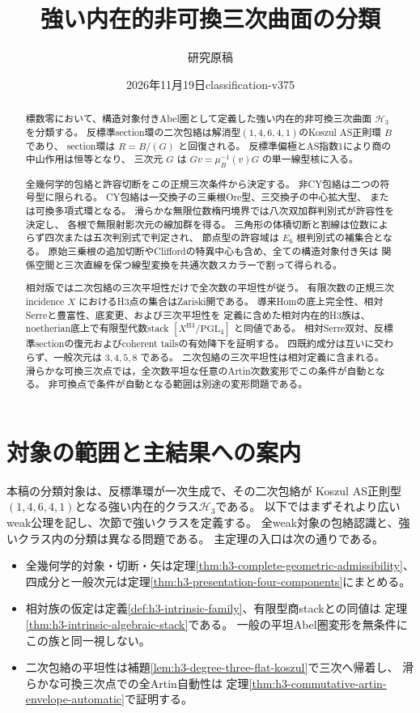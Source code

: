 \documentclass[11pt,a4paper]{ltjsarticle}
\title{強い内在的非可換三次曲面の分類}
\author{研究原稿}
\date{2026年11月19日\quad classification-v375}
\theoremstyle{definition}\newtheorem{definition}[theorem]{定義}
\begin{document}
\maketitle
\begin{abstract}
標数零において、構造対象付きAbel圏として定義した強い内在的非可換三次曲面
$\mathcal H_3$ を分類する。
反標準section環の二次包絡は解消型$(1,4,6,4,1)$のKoszul AS正則環 $B$ であり、
section環は $R=B/(G)$ と回復される。
反標準偏極とAS指数1により商の中山作用は恒等となり、
三次元 $G$ は $Gv=\mu_B^{-1}(v)G$ の単一線型核に入る。

全幾何学的包絡と許容切断をこの正規三次条件から決定する。
非CY包絡は二つの符号型に限られる。
CY包絡は一交換子の三乗根Ore型、三交換子の中心拡大型、
または可換多項式環となる。
滑らかな無限位数楕円境界では八次双加群判別式が許容性を決定し、
各根で無限射影次元の線加群を得る。
三角形の体積切断と割線は位数によらず四次または五次判別式で判定され、
節点型の許容域は $E_6$ 根判別式の補集合となる。
原始三乗根の追加切断やCliffordの特異中心も含め、全ての構造対象付き矢は
関係空間と三次直線を保つ線型変換を共通次数スカラーで割って得られる。

相対版では二次包絡の三次平坦性だけで全次数の平坦性が従う。
有限次数の正規三次incidence $X$ におけるH3点の集合はZariski開である。
導来Homの底上完全性、相対Serreと豊富性、底変更、および三次平坦性を
定義に含めた相対内在的H3族は、noetherian底上で有限型代数stack
$[X^{\mathrm{H3}}/\mathrm{PGL}_4]$ と同値である。
相対Serre双対、反標準sectionの復元およびcoherent tailsの有効降下を証明する。
四既約成分は互いに交わらず、一般次元は $3,4,5,8$ である。
二次包絡の三次平坦性は相対定義に含まれる。
滑らかな可換三次点では，全次数平坦な任意のArtin次数変形でこの条件が自動となる。
非可換点で条件が自動となる範囲は別途の変形問題である。
\end{abstract}
\tableofcontents

\section{対象の範囲と主結果への案内}
本稿の分類対象は、反標準環が一次生成で、その二次包絡が
Koszul AS正則型$(1,4,6,4,1)$となる強い内在的クラス$\mathcal H_3$である。
以下ではまずそれより広いweak公理を記し、次節で強いクラスを定義する。
全weak対象の包絡認識と、強いクラス内の分類は異なる問題である。
主定理の入口は次の通りである。
\begin{itemize}
\item 全幾何学的対象・切断・矢は定理\ref{thm:h3-complete-geometric-admissibility}、
四成分と一般次元は定理\ref{thm:h3-presentation-four-components}にまとめる。
\item 相対族の仮定は定義\ref{def:h3-intrinsic-family}、有限型商stackとの同値は
定理\ref{thm:h3-intrinsic-algebraic-stack}である。
一般の平坦Abel圏変形を無条件にこの族と同一視しない。
\item 二次包絡の平坦性は補題\ref{lem:h3-degree-three-flat-koszul}で三次へ帰着し、
滑らかな可換三次点での全Artin自動性は
定理\ref{thm:h3-commutative-artin-envelope-automatic}で証明する。
\end{itemize}
\end{document}
